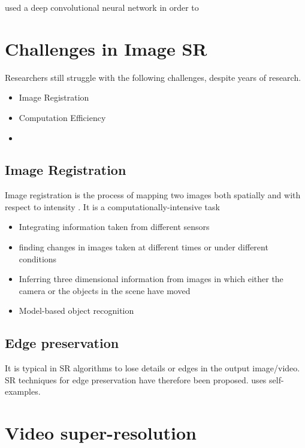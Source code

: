 \cite{Dong2014} used a deep convolutional neural network in order to 


\section{Challenges in Image SR}
Researchers still struggle with the following challenges, despite years of research.
\begin{itemize}
	\item Image Registration
	\item Computation Efficiency
	\item 
\end{itemize}
\subsection{Image Registration}
Image registration is the process of mapping two images both spatially and with respect to intensity \citep{Brown1992}. It is a computationally-intensive task \citep{Yang2010a}
\begin{itemize}
	\item Integrating information taken from different sensors
	\item finding changes in images taken at different times or under different conditions
	\item Inferring three dimensional information from images in which either the camera or the objects in the scene have moved
	\item Model-based object recognition
\end{itemize}

\subsection{Edge preservation}
It is typical in SR algorithms to lose details or edges in the output image/video. 
SR techniques for edge preservation have therefore been proposed. 
\cite{Vishnukumar2014} uses self-examples.

\section{Video super-resolution}

